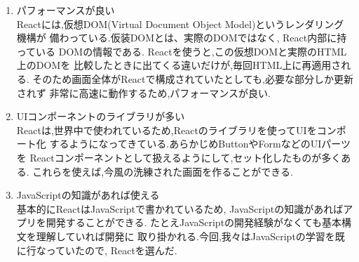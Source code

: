 	\begin{enumerate}
		\item パフォーマンスが良い \\
		Reactには,仮想DOM(Virtual Document Object Model)というレンダリング機構が
		備わっている.仮装DOMとは、実際のDOMではなく, React内部に持っている 
		DOMの情報である. Reactを使うと,この仮想DOMと実際のHTML上のDOMを
		比較したときに出てくる違いだけが,毎回HTML上に再適用される.
		そのため画面全体がReactで構成されていたとしても,必要な部分しか更新されず
		非常に高速に動作するため,パフォーマンスが良い.\\

		\item UIコンポーネントのライブラリが多い \\
		Reactは,世界中で使われているため,Reactのライブラリを使ってUIをコンポート化
		するようになってきている.あらかじめButtonやFormなどのUIパーツを
		Reactコンポーネントとして扱えるようにして,セット化したものが多くある.
		これらを使えば,今風の洗練された画面を作ることができる.\\

		\item JavaScriptの知識があれば使える \\
		基本的にReactはJavaScriptで書かれているため,
		JavaScriptの知識があればアプリを開発することができる.
		たとえJavaScriptの開発経験がなくても基本構文を理解していれば開発に
		取り掛かれる.今回,我々はJavaScriptの学習を既に行なっていたので,
		Reactを選んだ.
	\end{enumerate}
	
